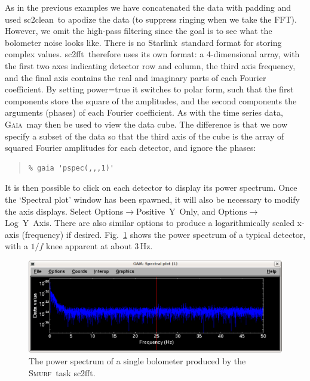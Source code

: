 \documentclass[twoside,11pt]{article}
\newenvironment{myquote}{\begin{quote}\begin{small}}{\end{small}\end{quote}}
\newcommand{\starlink}{\htmladdnormallink{Starlink}{http://star-www.rl.ac.uk/}}
\newcommand{\gaia}{\xref{\textsc{Gaia}}{sun214}{}}
\newcommand{\smurf}{\xref{\textsc{Smurf}}{sun258}{}}
\newcommand{\task}[1]{\textsf{#1}}
\newcommand{\fft}{\xref{\task{sc2fft}}{sun258}{SC2FFT}}
\newcommand{\clean}{\xref{\task{sc2clean}}{sun258}{SC2CLEAN}}
\newcommand{\htmladdnormallink}[2]{#1}
\newcommand{\xref}[3]{#1}
\renewcommand{\_}{\texttt{\symbol{95}}}
\begin{document}
As in the previous examples we have concatenated the data with padding
and used \clean\ to apodize the data (to suppress ringing when we take
the FFT). However, we omit the high-pass filtering since the goal is
to see what the bolometer noise looks like. There is no \starlink\
standard format for storing complex values. \fft\ therefore uses its
own format: a 4-dimensional array, with the first two axes indicating
detector row and column, the third axis frequency, and the final axis
contains the real and imaginary parts of each Fourier coefficient. By
setting power=true it switches to polar form, such that the first
components store the square of the amplitudes, and the second
components the arguments (phases) of each Fourier coefficient. As with
the time series data, \gaia\ may then be used to view the data
cube. The difference is that we now specify a subset of the data so
that the third axis of the cube is the array of squared Fourier
amplitudes for each detector, and ignore the phases:

\begin{myquote}
\begin{verbatim}
% gaia 'pspec(,,,1)'
\end{verbatim}
\end{myquote}

It is then possible to click on each detector to display its power
spectrum. Once the `Spectral plot' window has been spawned, it will
also be necessary to modify the axis displays. Select
Options$\rightarrow$Positive~Y~Only, and
Options$\rightarrow$Log~Y~Axis.  There are also similar options to
produce a logarithmically scaled x-axis (frequency) if
desired. Fig.~\ref{fig:pspec} shows the power spectrum of a typical
detector, with a $1/f$ knee apparent at about 3\,Hz.

\begin{figure}
\begin{center}
\includegraphics[width=\linewidth]{pspec.eps}
\caption{The power spectrum of a single bolometer produced by the
  \smurf\ task \fft.}
\label{fig:pspec}
\end{center}
\end{figure}
\end{document}
